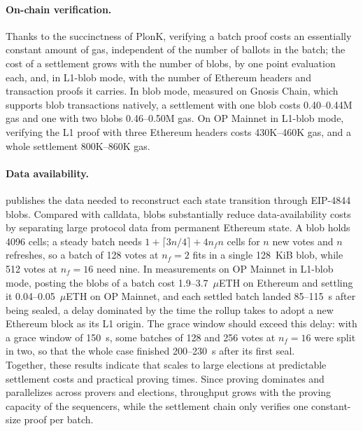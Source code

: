 \paragraph{On-chain verification.} Thanks to the succinctness of PlonK, verifying a batch proof costs an essentially constant amount of gas, independent of the number of ballots in the batch; the cost of a settlement grows with the number of blobs, by one point evaluation each, and, in L1-blob mode, with the number of Ethereum headers and transaction proofs it carries. In blob mode, measured on Gnosis Chain, which supports blob transactions natively, a settlement with one blob costs 0.40--0.44M gas and one with two blobs 0.46--0.50M gas. On OP Mainnet in L1-blob mode, verifying the L1 proof with three Ethereum headers costs 430K--460K gas, and a whole settlement 800K--860K gas.

\paragraph{Data availability.} \Davinci publishes the data needed to reconstruct each state transition through EIP-4844 blobs. Compared with calldata, blobs substantially reduce data-availability costs by separating large protocol data from permanent Ethereum state. A blob holds 4096 cells; a steady batch needs $1 + \lceil 3n/4 \rceil + 4 n_f n$ cells for $n$ new votes and $n$ refreshes, so a batch of 128 votes at $n_f = 2$ fits in a single 128~KiB blob, while 512 votes at $n_f = 16$ need nine. In measurements on OP Mainnet in L1-blob mode, posting the blobs of a batch cost 1.9--3.7~$\mu$ETH on Ethereum and settling it 0.04--0.05~$\mu$ETH on OP Mainnet, and each settled batch landed 85--115~s after being sealed, a delay dominated by the time the rollup takes to adopt a new Ethereum block as its L1 origin. The grace window should exceed this delay: with a grace window of 150~s, some batches of 128 and 256 votes at $n_f = 16$ were split in two, so that the whole case finished 200--230~s after its first seal.\\

Together, these results indicate that \davinci scales to large elections at predictable settlement costs and practical proving times. Since proving dominates and parallelizes across provers and elections, throughput grows with the proving capacity of the sequencers, while the settlement chain only verifies one constant-size proof per batch.
